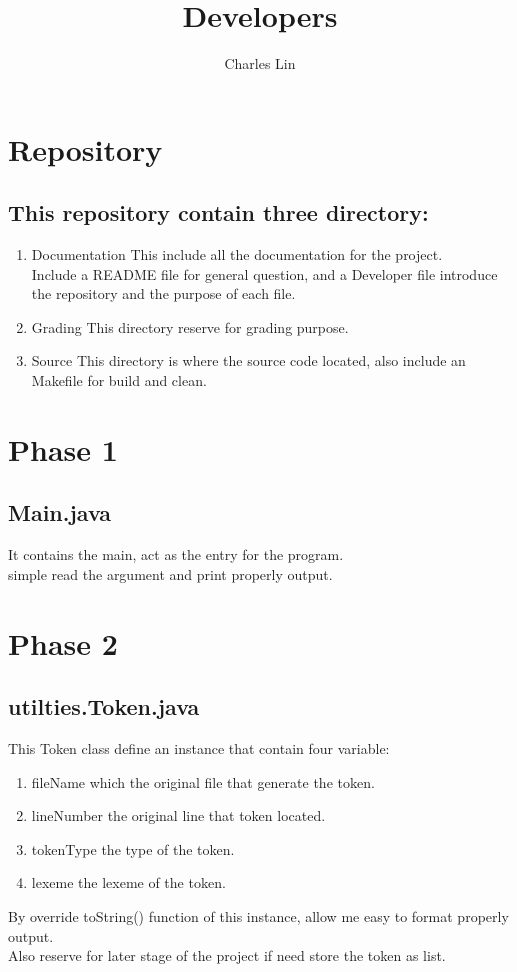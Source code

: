 \documentclass{article}
\title{Developers}
\author{Charles Lin}
\begin{document}
    \maketitle

    \section{Repository}
    \subsection{This repository contain three directory:}
    \begin{enumerate}
        \item Documentation This include all the documentation for the project.
        \\Include a README file for general question, and a Developer file introduce the repository and the purpose of each file.
        \item Grading This directory reserve for grading purpose.
        \item Source This directory is where the source code located, also include an Makefile for build and clean.
    \end{enumerate}

    \section{Phase 1}
    \subsection{Main.java}
    It contains the main, act as the entry for the program.\\
    simple read the argument and print properly output.
    \section{Phase 2}
    \subsection{utilties.Token.java}
    This Token class define an instance that contain four variable:
    \begin{enumerate}
        \item fileName which the original file that generate the token.
        \item lineNumber the original line that token located.
        \item tokenType the type of the token.
        \item lexeme the lexeme of the token.
    \end{enumerate}
    By override toString() function of this instance, allow me easy to format properly output.
    \\Also reserve for later stage of the project if need store the token as list.
\end{document}
